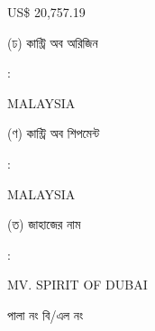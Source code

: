 \documentclass[12pt]{article}
\newcommand{\price}{US\$ 20,757.19}
\newcommand{\co}{MALAYSIA}
\newcommand{\coship}{MALAYSIA}
\newcommand{\vessel}{MV. SPIRIT OF DUBAI}
\begin{document}
\begin{minipage}[t]{0.53\linewidth}
{\price}
\\
\end{minipage}
\begin{minipage}[t]{0.05\linewidth}
\hspace*{1em}
\end{minipage}
\begin{minipage}[t]{0.40\linewidth}
(ঢ) কান্ট্রি অব অরিজিন
\end{minipage}
\begin{minipage}[t]{0.02\linewidth}
:
\end{minipage}
\begin{minipage}[t]{0.53\linewidth}
{\co}
\\
\end{minipage}
\begin{minipage}[t]{0.05\linewidth}
\hspace*{1em}
\end{minipage}
\begin{minipage}[t]{0.40\linewidth}
(ণ) কান্ট্রি অব শিপমেন্ট
\end{minipage}
\begin{minipage}[t]{0.02\linewidth}
:
\end{minipage}
\begin{minipage}[t]{0.53\linewidth}
{\coship}
\\
\end{minipage}
\begin{minipage}[t]{0.05\linewidth}
\hspace*{1em}
\end{minipage}
\begin{minipage}[t]{0.40\linewidth}
(ত) জাহাজের নাম
\end{minipage}
\begin{minipage}[t]{0.02\linewidth}
:
\end{minipage}
\begin{minipage}[t]{0.53\linewidth}
{\vessel}
\end{minipage}
\begin{minipage}[t]{0.05\linewidth}
\hspace*{1em}
\end{minipage}
\begin{minipage}[t]{0.40\linewidth}
\hspace*{1.8em}পালা নং বি/এল নং
\end{minipage}
\begin{minipage}[t]{0.02\linewidth}
\hspace{1em}
\end{minipage}
\end{document}
